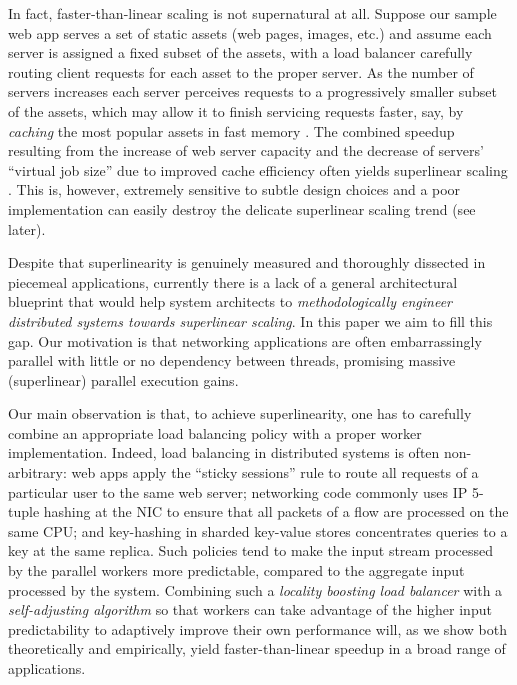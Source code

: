 In fact, faster-than-linear scaling is not supernatural at all. Suppose our sample web app serves a set of static assets (web pages, images, etc.) and assume each server is assigned a fixed subset of the assets, with a load balancer carefully routing client requests for each asset to the proper server. As the number of servers increases each server perceives requests to a progressively smaller subset of the assets, which may allow it to finish servicing requests faster, say, by \emph{caching} the most popular assets in fast memory \cite{10.5555/1012889.1012894, 271208}. The combined speedup resulting from the increase of web server capacity and the decrease of servers' ``virtual job size'' due to improved cache efficiency often yields superlinear scaling \cite{556383, dobb-1, dobb-2, 7733347, 80148, wikipedia, 10.1145/42411.42415, 556383, scalability-analyzed, icsoft20}. This is, however, extremely sensitive to subtle design choices and a poor implementation can easily destroy the delicate superlinear scaling trend (see later).

Despite that superlinearity is genuinely measured \cite{scalability-analyzed, sdn-analytitcs, 6483679, 10.1007/978-3-319-77610-1, 10.1145/3627703.3629574, icsoft20} and thoroughly dissected \cite{dobb-1, dobb-2, 10.1145/2773212.2789974, 556383, 7733347, 80148} in piecemeal applications, currently there is a lack of a general architectural blueprint that would help system architects to \emph{methodologically engineer distributed systems towards superlinear scaling}. In this paper we aim to fill this gap. Our motivation is that networking applications are often embarrassingly parallel with little or no dependency between threads, promising massive (superlinear) parallel execution gains.

Our main observation is that, to achieve superlinearity, one has to carefully combine an appropriate load balancing policy with a proper worker implementation. Indeed, load balancing in distributed systems is often non-arbitrary: web apps apply the ``sticky sessions'' rule to route all requests of a particular user to the same web server; %
networking code commonly uses IP 5-tuple hashing at the NIC to ensure that all packets of a flow are processed on the same CPU; %
and key-hashing in sharded key-value stores concentrates queries to a key at the same replica. Such policies tend to make the input stream processed by the parallel workers more predictable, compared to the aggregate input processed by the system. Combining such a \emph{locality boosting load balancer} with a \emph{self-adjusting algorithm} so that workers can take advantage of the higher input predictability to adaptively improve their own performance will, as we show both theoretically and empirically, yield faster-than-linear speedup in a broad range of applications.

